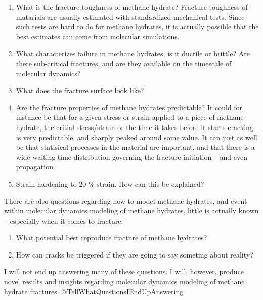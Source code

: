 \begin{enumerate}
\item What is the fracture toughness of methane hydrate? Fracture toughness of matarials are usually estimated with standardized mechanical tests. Since such tests are hard to do for methane hydrates, it is actually possible that the best estimates can come from molecular simulations. 
\item What characterizes failure in methane hydrates, is it ductile or brittle? Are there sub-critical fractures, and are they available on the timescale of molecular dynamics?
\item What does the fracture surface look like?
\item Are the fracture properties of methane hydrates predictable? It could for instance be that for a given stress or strain applied to a piece of methane hydrate, the critial stress/strain or the time it takes before it starts cracking is very predictable, and sharply peaked around some value. It can just as well be that statisical processes in the material are important, and that there is a wide waiting-time distribution governing the fracture initiation -- and even propagation.
\item Strain hardening to 20 \% strain. How can this be explained?
\end{enumerate}

There are also questions regarding how to model methane hydrates, and event within molecular dynamics modeling of methane hydrates, little is actually known -- especially when it comes to fracture. 

\begin{enumerate}
\item What potential best reproduce fracture of methane hydrates?
\item How can cracks be triggered if they are going to say someting about reality?
\end{enumerate}

I will not end up answering many of these questions. I will, however, produce novel results and insights regarding molecular dynamics modeling of methane hydrate fractures.
@TellWhatQuestionsIEndUpAnswering